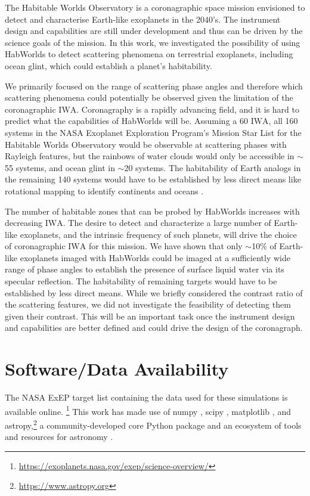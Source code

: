 \documentclass[
    usenatbib,
]{mnras}
\newcommand{\IWA}{\ensuremath{\mathrm{IWA}}}
\newcommand{\hwo}{HabWorlds}
\begin{document}
The Habitable Worlds Observatory is a coronagraphic space mission envisioned to detect and characterise Earth-like exoplanets in the 2040's. 
%
The instrument design and capabilities are still under development and thus can be driven by the science goals of the mission.
%
In this work, we investigated the possibility of using \hwo{} to detect scattering phenomena on terrestrial exoplanets, including ocean glint, which could establish a planet's habitability. 

We primarily focused on the range of scattering phase angles and therefore which scattering phenomena could potentially be observed given the limitation of the coronagraphic \IWA{}.
%
Coronagraphy is a rapidly advancing field, and it is hard to predict what the capabilities of \hwo{} will be.
%
Assuming a \SI{60}{\mas} \IWA{}, all 160 systems in the NASA Exoplanet Exploration Program's Mission Star List for the Habitable Worlds Observatory would be observable at scattering phases with Rayleigh features, but the rainbows of water clouds would only be accessible in $\sim$55 systems, and ocean glint in $\sim$20 systems.
%
The habitability of Earth analogs in the remaining 140 systems would have to be established by less direct means like rotational mapping to identify continents and oceans \citep[e.g.,][]{2009ApJ...700..915C,lustig2019}.   
%

The number of habitable zones that can be probed by \hwo{} increases with decreasing \IWA{}. 
%
The desire to detect and characterize a large number of Earth-like exoplanets, and the intrinsic frequency of such planets, will drive the choice of coronagraphic \IWA{} for this mission.
%
We have shown that only $\sim$10\% of Earth-like exoplanets imaged with \hwo{} could be imaged at a sufficiently wide range of phase angles to establish the presence of surface liquid water via its specular reflection.  
%
The habitability of remaining targets would have to be established by less direct means.
%
While we briefly considered the contrast ratio of the scattering features, we did not investigate the feasibility of detecting them given their contrast. 
%
This will be an important task once the instrument design and capabilities are better defined and could drive the design of the coronagraph. 

\section*{Software/Data Availability}

The NASA ExEP target list containing the data used for these simulations is available online.
%
\footnote{\url{https://exoplanets.nasa.gov/exep/science-overview/}}
This work has made use of \textsf{numpy}
 \citep{NumPy2020}, \textsf{scipy} \citep{scipy_2020}, \textsf{matplotlib} \citep{matplotlib2007}, and \textsf{astropy},\footnote{\url{https://www.astropy.org}} a community-developed core Python package and an ecosystem of tools and resources for astronomy \citep{astropy:2013, astropy:2018, astropy:2022}.
\end{document}
